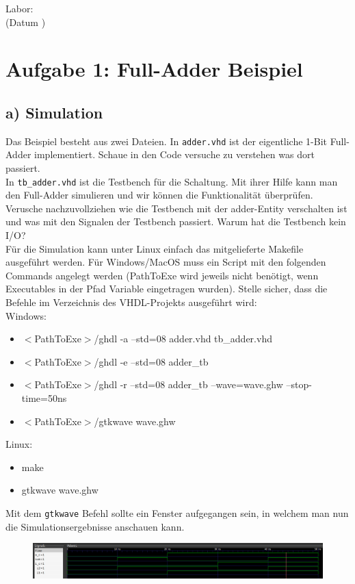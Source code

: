 \documentclass[a4paper]{scrartcl}
\def\header#1#2{
  \begin{center}
    {\Large Labor: #1 \TOPIC}\\
    {(Datum #2)}
  \end{center}
}
\begin{document}
\header{ \NUMBER}{\DATE}


\section*{Aufgabe 1: Full-Adder Beispiel}
\subsection*{a) Simulation}
Das Beispiel besteht aus zwei Dateien. In \texttt{adder.vhd} ist der eigentliche 1-Bit Full-Adder implementiert. 
Schaue in den Code versuche zu verstehen was dort passiert. \\
In \texttt{tb\_adder.vhd} ist die Testbench für die Schaltung. Mit ihrer Hilfe kann man den Full-Adder simulieren und wir können die Funktionalität überprüfen.
Verusche nachzuvollziehen wie die Testbench mit der adder-Entity verschalten ist und was mit den Signalen der Testbench passiert. Warum hat die Testbench kein I/O?\\

Für die Simulation kann unter Linux einfach das mitgelieferte Makefile ausgeführt werden. Für Windows/MacOS muss ein Script mit den folgenden Commands angelegt werden (PathToExe 
wird jeweils nicht benötigt, wenn Executables in der Pfad Variable eingetragen wurden). Stelle sicher, dass die Befehle im Verzeichnis des VHDL-Projekts ausgeführt wird:\\
Windows:
\begin{itemize}
  \item $<$PathToExe$>$/ghdl -a --std=08 adder.vhd tb\_adder.vhd
	\item $<$PathToExe$>$/ghdl -e --std=08 adder\_tb
	\item $<$PathToExe$>$/ghdl -r --std=08 adder\_tb --wave=wave.ghw --stop-time=50ns
	\item $<$PathToExe$>$/gtkwave wave.ghw
\end{itemize}
Linux:
\begin{itemize}
  \item make
	\item gtkwave wave.ghw
\end{itemize}

Mit dem \texttt{gtkwave} Befehl sollte ein Fenster aufgegangen sein, in welchem man nun die Simulationsergebnisse anschauen kann.
\begin{figure}[h]
  \includegraphics[width=\textwidth]{gtkwave.png}
\end{figure}
\end{document}
